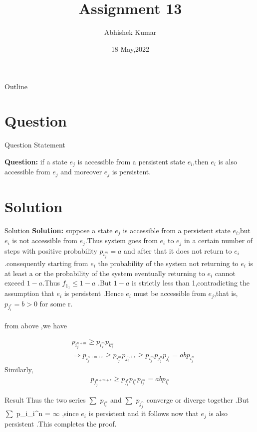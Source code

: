 \documentclass{beamer}
\title{Assignment 13}
\author{Abhishek Kumar}
\institute{IIT Hyderabad}
\date{18 May,2022}
\begin{document}
	\begin{frame}
		\titlepage
	\end{frame}
	\begin{frame}{Outline}
		\tableofcontents
	\end{frame}
	\section{Question}
	\begin{frame}{Question Statement}
		
		\textbf{Question:} if a state $e_j$ is accessible from a persistent state $e_i$,then $e_i$ is also accessible from $e_j$ and moreover $e_j$ is persistent.
	\end{frame}
	\section{Solution}
	\begin{frame}{Solution}
		\textbf{Solution:}
		suppose a state $e_j$ is accessible from a persistent  state $e_i$,but $e_i$ is not accessible from $e_j$.Thus system goes from $e_i$ to $e_j$ in a certain number of steps with positive probability $p_i_j^{m}=a$ and after that it does not return to $e_i$.consequently starting from  $e_i$ the probability of the system not returning to $e_i$ is at least a or the probability of the system eventually returning to $e_i$ cannot exceed $1-a$.Thus $f_1_1 \le 1-a$  .But $1-a$ is strictly less than 1,contradicting the assumption that $e_i$ is persistent .Hence $e_i$ must be accessible from $e_j$,that is,$p_j_i^{r}=b>0$ for some r.\\\\
		
		from above ,we have 
		
		\begin{align}
			&p_i_j^{n+m} \ge p_i_k^{m}p_k_j^{n} \\
			&\Rightarrow p_i_j^{n+m+r} \ge p_i_j^{m}p_j_i^{n+r} \ge p_i_j^{m} p_j_j^{n}p_j_i^{r} = abp_i_j^{n}
		\end{align}
		Similarly,
		\begin{align}
			p_j_j^{n+m+r} \ge p_j_i^{r}p_i_i^{n}p_i_j^{m}=abp_i_i^{n}
		\end{align}
		
	\end{frame}
	\begin{frame}
		
		\begin{alertblock}{Result}
			Thus the two series $\sum$ $p_i_i^{n}$ and $\sum$ $p_j_j^{n}$ converge or diverge together .But $\sum$ p_i_i^{n} = $\infty$ ,since $e_i$ is persistent and it follows now that $e_j$ is also persistent .This completes the proof.
		\end{alertblock}
	\end{frame}
	
\end{document}
